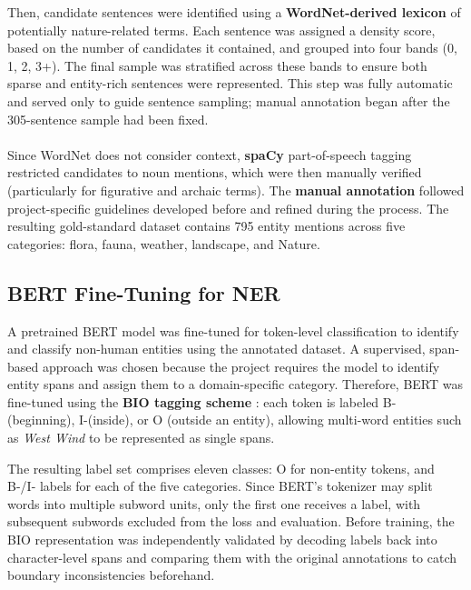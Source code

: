 \documentclass[11pt]{article}
\begin{document}
Then, candidate sentences were identified using a \textbf{WordNet-derived lexicon} \cite{miller:95} of potentially nature-related terms. Each sentence was assigned a density score, based on the number of candidates it contained, and grouped into four bands (0, 1, 2, 3+). The final sample was stratified across these bands to ensure both sparse and entity-rich sentences were represented. This step was fully automatic and served only to guide sentence sampling; manual annotation began after the 305-sentence sample had been fixed. \\ \\

Since WordNet does not consider context, \textbf{spaCy} part-of-speech tagging restricted candidates to noun mentions, which were then manually verified (particularly for figurative and archaic terms). The \textbf{manual annotation} followed project-specific guidelines developed before and refined during the process. The resulting gold-standard dataset contains 795 entity mentions across five categories: flora, fauna, weather, landscape, and Nature.

\subsection{BERT Fine-Tuning for NER}
A pretrained BERT model \cite{devlin:19} was fine-tuned for token-level classification to identify and classify non-human entities using the annotated dataset. A supervised, span-based approach was chosen because the project requires the model to identify entity spans and assign them to a domain-specific category. Therefore, BERT was fine-tuned using the \textbf{BIO tagging scheme} \cite{ramshaw:95}: each token is labeled B- (beginning), I-(inside), or O (outside an entity), allowing multi-word entities such as \textit{West Wind} to be represented as single spans.

The resulting label set comprises eleven classes: O for non-entity tokens, and B-/I- labels for each of the five categories. Since BERT’s tokenizer may split words into multiple subword units, only the first one receives a label, with subsequent subwords excluded from the loss and evaluation. Before training, the BIO representation was independently validated by decoding labels back into character-level spans and comparing them with the original annotations to catch boundary inconsistencies beforehand.
\end{document}
